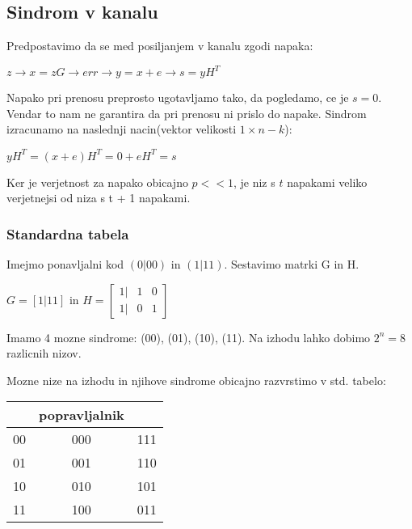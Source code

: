 \documentclass{article}
\begin{document}
\begin{multicols}{2}
	\subsection{Sindrom v kanalu}
	Predpostavimo da se med posiljanjem v kanalu zgodi napaka:
	\begin{center}
		\begin{math}
			z \rightarrow x = zG \rightarrow err\rightarrow y = x + e \rightarrow s = yH^T
		\end{math}
	\end{center}
	Napako pri prenosu preprosto ugotavljamo tako, da pogledamo, ce je $s = 0$. Vendar to nam ne garantira da pri prenosu ni prislo do napake.
	Sindrom izracunamo na naslednji nacin(vektor velikosti $1 \times n - k$):
	\begin{center}
		\begin{math}
			yH^T = (x + e)H^T = 0 + eH^T = s
		\end{math}
	\end{center}
	Ker je verjetnost za napako obicajno $p << 1$, je niz s $t$ napakami veliko
	verjetnejsi od niza s t + 1 napakami.

	\subsubsection{Standardna tabela}
	Imejmo ponavljalni kod $(0|00)$ in $(1|11)$. Sestavimo matrki G in H.

	\begin{math}
		G = [1|11] \text{ in } H =
		\begin{bmatrix}
			1 | & 1 & 0 \\
			1 | & 0 & 1
		\end{bmatrix}
	\end{math}


	Imamo 4 mozne sindrome: (00), (01), (10), (11). Na izhodu lahko dobimo $2^n = 8$
	razlicnih nizov.

	Mozne nize na izhodu in njihove sindrome obicajno razvrstimo v std. tabelo:
	\begin{center}
		\begin{tabular}{ c|cc }
			\text{sindrom} & popravljalnik &     \\
			\hline
			00             & 000           & 111 \\
			01             & 001           & 110 \\
			10             & 010           & 101 \\
			11             & 100           & 011
		\end{tabular}
	\end{center}


\end{multicols}
\end{document}
